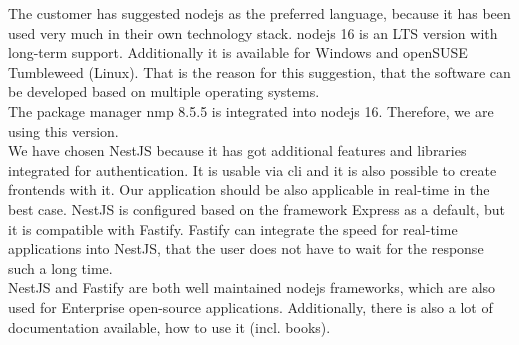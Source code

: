 \documentclass[12pt, a4paper]{article}
\begin{document}
The customer has suggested nodejs as the preferred language, because it has been used very much in their own technology stack. nodejs 16 is an LTS version with long-term support. Additionally it is available for Windows and openSUSE Tumbleweed (Linux). That is the reason for this suggestion, that the software can be developed based on multiple operating systems. 
\\
The package manager nmp 8.5.5 is integrated into nodejs 16. Therefore, we are using this version.
\\
We have chosen NestJS because it has got additional features and libraries integrated for authentication. It is usable via cli and it is also possible to create frontends with it. Our application should be also applicable in real-time in the best case. NestJS is configured based on the framework Express as a default, but it is compatible with Fastify. Fastify can integrate the speed for real-time applications into NestJS, that the user does not have to wait for the response such a long time. 
\\
NestJS and Fastify are both well maintained nodejs frameworks, which are also used for Enterprise open-source applications. Additionally, there is also a lot of documentation available, how to use it (incl. books).
\end{document}
